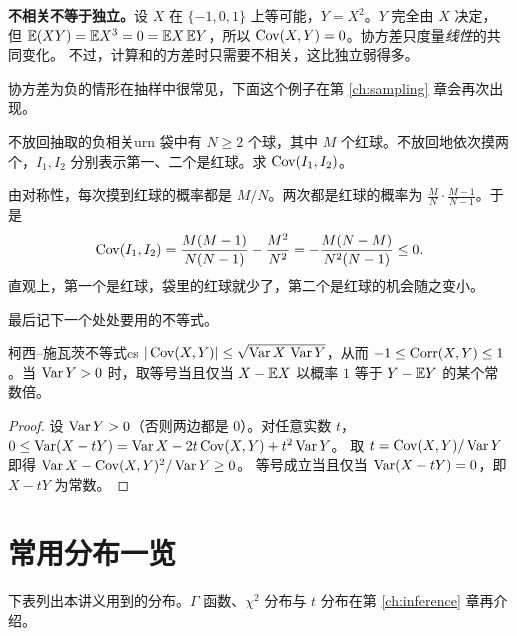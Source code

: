 \begin{warning}
\textbf{不相关不等于独立。}设 $X$ 在 $\{-1,0,1\}$ 上等可能，$Y=X^2$。$Y$ 完全由 $X$ 决定，
但 $\mathbb{E}(XY)=\mathbb{E} X^3=0=\mathbb{E} X\,\mathbb{E} Y$，所以 $\operatorname{Cov}(X,Y)=0$。协方差只度量\emph{线性}的共同变化。
不过，计算和的方差时只需要不相关，这比独立弱得多。
\end{warning}

协方差为负的情形在抽样中很常见，下面这个例子在第 \ref{ch:sampling} 章会再次出现。

\begin{example}{不放回抽取的负相关}{urn}
袋中有 $N\ge2$ 个球，其中 $M$ 个红球。不放回地依次摸两个，$I_1,I_2$ 分别表示第一、二个是红球。求 $\operatorname{Cov}(I_1,I_2)$。
\end{example}
\begin{solution}
由对称性，每次摸到红球的概率都是 $M/N$。两次都是红球的概率为 $\frac{M}{N}\cdot\frac{M-1}{N-1}$。于是
\[
\operatorname{Cov}(I_1,I_2)=\frac{M(M-1)}{N(N-1)}-\frac{M^2}{N^2}=-\frac{M(N-M)}{N^2(N-1)}\le 0 .
\]
直观上，第一个是红球，袋里的红球就少了，第二个是红球的机会随之变小。
\end{solution}

最后记下一个处处要用的不等式。

\begin{proposition}{柯西–施瓦茨不等式}{cs}
$|\operatorname{Cov}(X,Y)|\le\sqrt{\operatorname{Var} X\,\operatorname{Var} Y}$，从而 $-1\le\operatorname{Corr}(X,Y)\le1$。当 $\operatorname{Var} Y>0$ 时，取等号当且仅当
$X-\mathbb{E} X$ 以概率 $1$ 等于 $Y-\mathbb{E} Y$ 的某个常数倍。
\end{proposition}
\begin{proof}
设 $\operatorname{Var} Y>0$（否则两边都是 0）。对任意实数 $t$，
$0\le\operatorname{Var}(X-tY)=\operatorname{Var} X-2t\operatorname{Cov}(X,Y)+t^2\operatorname{Var} Y$。
取 $t=\operatorname{Cov}(X,Y)/\operatorname{Var} Y$ 即得 $\operatorname{Var} X-\operatorname{Cov}(X,Y)^2/\operatorname{Var} Y\ge0$。
等号成立当且仅当 $\operatorname{Var}(X-tY)=0$，即 $X-tY$ 为常数。
\end{proof}

\section{常用分布一览}

下表列出本讲义用到的分布。$\Gamma$ 函数、$\chi^2$ 分布与 $t$ 分布在第 \ref{ch:inference} 章再介绍。

